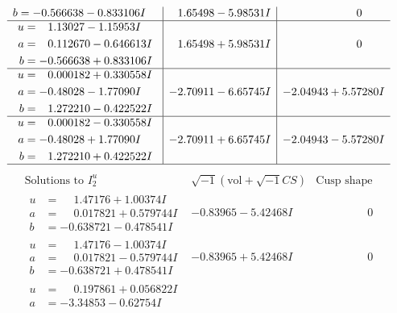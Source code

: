\documentclass[1p]{elsarticle_modified}
\theoremstyle{definition}
\newcommand{\I}{\sqrt{-1}}
\begin{document}
$$\begin{array}{c|c|c}
\begin{aligned}
b &= -0.566638 - 0.833106 I\end{aligned}
 & \phantom{-}1.65498 - 5.98531 I & \phantom{-0.000000 } 0 \\ \hline\begin{aligned}
u &= \phantom{-}1.13027 - 1.15953 I \\
a &= \phantom{-}0.112670 - 0.646613 I \\
b &= -0.566638 + 0.833106 I\end{aligned}
 & \phantom{-}1.65498 + 5.98531 I & \phantom{-0.000000 } 0 \\ \hline\begin{aligned}
u &= \phantom{-}0.000182 + 0.330558 I \\
a &= -0.48028 - 1.77090 I \\
b &= \phantom{-}1.272210 - 0.422522 I\end{aligned}
 & -2.70911 - 6.65745 I & -2.04943 + 5.57280 I \\ \hline\begin{aligned}
u &= \phantom{-}0.000182 - 0.330558 I \\
a &= -0.48028 + 1.77090 I \\
b &= \phantom{-}1.272210 + 0.422522 I\end{aligned}
 & -2.70911 + 6.65745 I & -2.04943 - 5.57280 I\\
 \hline 
 \end{array}$$\newpage$$\begin{array}{c|c|c}  
\text{Solutions to }I^u_{2}& \I (\text{vol} + \sqrt{-1}CS) & \text{Cusp shape}\\
 \hline 
\begin{aligned}
u &= \phantom{-}1.47176 + 1.00374 I \\
a &= \phantom{-}0.017821 + 0.579744 I \\
b &= -0.638721 - 0.478541 I\end{aligned}
 & -0.83965 - 5.42468 I & \phantom{-0.000000 } 0 \\ \hline\begin{aligned}
u &= \phantom{-}1.47176 - 1.00374 I \\
a &= \phantom{-}0.017821 - 0.579744 I \\
b &= -0.638721 + 0.478541 I\end{aligned}
 & -0.83965 + 5.42468 I & \phantom{-0.000000 } 0 \\ \hline\begin{aligned}
u &= \phantom{-}0.197861 + 0.056822 I \\
a &= -3.34853 - 0.62754 I \\

\end{aligned}
\end{array}$$
\end{document}
